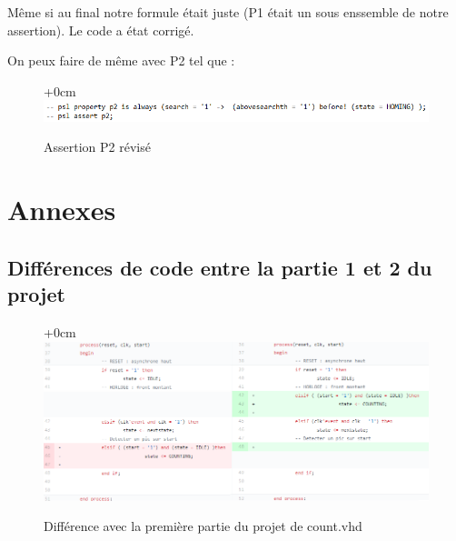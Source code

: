 \documentclass{article}
\begin{document}
Même si au final notre formule était juste (P1 était un sous enssemble de notre assertion). Le code a état corrigé.

On peux faire de même avec P2 tel que :

\begin{figure}[!h]
\advance\leftskip+0cm
\includegraphics[scale=0.6]{PSL/P2P.PNG}
\caption{Assertion P2 révisé }
\end{figure} 



\newpage
\section{Annexes}
\subsection{Différences de code entre la partie 1 et 2 du projet}

\begin{figure}[!h]
\advance\leftskip+0cm
\includegraphics[scale=0.6]{modifCount.PNG}
\caption{Différence avec la première partie du projet de count.vhd}
\end{figure} 
\end{document}
